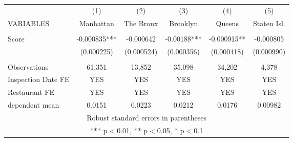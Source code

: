 \begin{tabular}{lccccc} \hline
 & (1) & (2) & (3) & (4) & (5) \\
VARIABLES & Manhattan & The Bronx & Brooklyn & Queens & Staten Isl. \\ \hline
 &  &  &  &  &  \\
Score & -0.000835*** & -0.000642 & -0.00188*** & -0.000915** & -0.000805 \\
 & (0.000225) & (0.000524) & (0.000356) & (0.000418) & (0.000990) \\
 &  &  &  &  &  \\
Observations & 61,351 & 13,852 & 35,098 & 34,202 & 4,378 \\
Inspection Date FE & YES & YES & YES & YES & YES \\
Restaurant FE & YES & YES & YES & YES & YES \\
 dependent mean & 0.0151 & 0.0223 & 0.0212 & 0.0176 & 0.00982 \\ \hline
\multicolumn{6}{c}{ Robust standard errors in parentheses} \\
\multicolumn{6}{c}{ *** p$<$0.01, ** p$<$0.05, * p$<$0.1} \\
\end{tabular}
